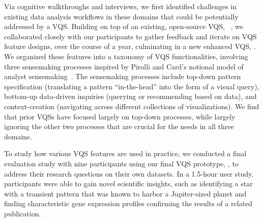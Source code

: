 \par Via cognitive walkthroughs and interviews, we first identified challenges in existing data analysis workflows in these domains
that could be potentially addressed by a VQS. Building on top of an existing, open-source VQS, \zv~\cite{Siddiqui2017,Siddiqui2017VLDB}, we collaborated closely with our participants to gather feedback and iterate on VQS feature designs,
over the course of a year, culminating in a new enhanced VQS, \zvpp. We organized these features into a taxonomy of VQS functionalities, involving three sensemaking processes inspired by Pirolli and Card's notional model of analyst sensemaking~\cite{Pirolli}. The sensemaking processes include top-down pattern specification (translating a pattern ``in-the-head'' into the form of a visual query), bottom-up data-driven inquiries (querying or recommending based on data), and context-creation (navigating across different collections of visualizations). We find that prior VQSs have focused largely on top-down processes, while largely ignoring the other two processes that are crucial for the needs in all three domains.
\par To study how various VQS features
are used in practice,
we conducted a final evaluation study with nine participants
using our final VQS prototype, \zvpp,
to address their research questions
on their own datasets.
In a 1.5-hour user study, participants were able to
gain novel scientific insights,
such as identifying a star with a transient pattern
that was known to harbor a Jupiter-sized planet
and finding characteristic gene expression profiles confirming the results of a related publication. 

